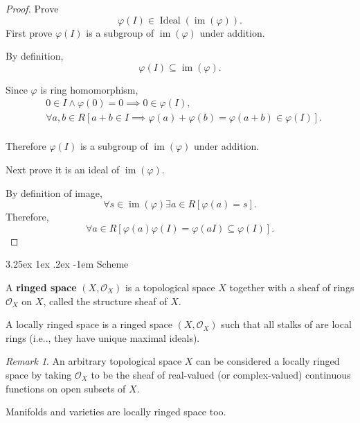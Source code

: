 \documentclass[12pt, letterpaper]{article}
\makeatletter
\renewcommand\subparagraph{\@startsection{subparagraph}{5}{\parindent}%
	{3.25ex \@plus1ex \@minus .2ex}%
	{0.75ex plus 0.1ex}%
	{\normalfont\normalsize\bfseries}}
\newcommand\ie{i.e\@ifnextchar.{}{.\@}}
\renewcommand\subparagraph{\@startsection{subparagraph}{5}{\parindent}%
	{3.25ex \@plus1ex \@minus .2ex}%
	{-1em}%
	{\normalfont\normalsize\bfseries}}
\theoremstyle{definition}
\theoremstyle{remark}
\newtheorem*{rem*}{Remark}
\theoremstyle{definition}
\theoremstyle{plain}
\numberwithin{equation}{section}
\makeatother
\begin{document}
	\begin{proof}
		Prove \[ \varphi(I)\in\operatorname{Ideal}(\operatorname{im}(\varphi)).\]
		First prove $\varphi(I)$ is a subgroup of $\operatorname{im}(\varphi)$ under addition.
		
		By definition,
		\[ \varphi(I)\subseteq\operatorname{im}(\varphi) .\]
		
		Since $\varphi$ is ring homomorphism,
		\[\begin{aligned}
			&0\in I\land \varphi(0)=0\implies 0\in\varphi(I),\\
			&\forall a,b\in R [a+b\in I \implies \varphi(a)+\varphi(b)=\varphi(a+b)\in\varphi(I) ].\\
		\end{aligned}  \]
	
		Therefore $\varphi(I)$ is a subgroup of $\operatorname{im}(\varphi)$ under addition.
		
		Next prove it is an ideal of $\operatorname{im}(\varphi)$.
		
		By definition of image,
		\[ \forall s\in\operatorname{im}(\varphi)\exists a\in R[\varphi(a)=s].  \]
		Therefore,
		\[ \forall a\in R[\varphi(a)\varphi(I)=\varphi(aI)\subseteq \varphi(I) ]. \]
		
	\end{proof}
	
	\subparagraph{Scheme}
	\begin{def*}
		A \textbf{ringed space} $(X,{\mathcal {O}}_{X})$ is a topological space $X$
		together with a sheaf of rings ${\mathcal {O}}_{X}$ on $X$,
		called the structure sheaf of $X$.
	\end{def*}
	
	\begin{def*}
		A locally ringed space is a ringed space $(X,{\mathcal  {O}}_{X})$ such that all stalks of 
		are local rings (\ie, they have unique maximal ideals).
	\end{def*}
	\begin{rem*}
		An arbitrary topological space $X$ can be considered a locally ringed space by taking ${\mathcal {O}}_{X}$ to be the sheaf of real-valued (or complex-valued) continuous functions on open subsets of $X$.
		
		Manifolds and varieties are locally ringed space too.
	\end{rem*}
\end{document}
